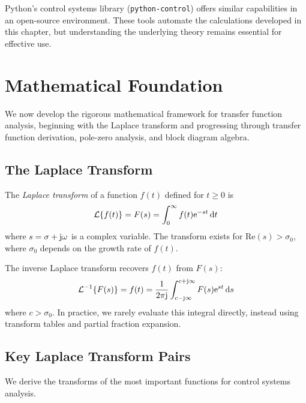 Python's control systems library (\texttt{python-control}) offers similar capabilities in an open-source environment. These tools automate the calculations developed in this chapter, but understanding the underlying theory remains essential for effective use.

\section{Mathematical Foundation}
\label{sec:math_foundation}

We now develop the rigorous mathematical framework for transfer function analysis, beginning with the Laplace transform and progressing through transfer function derivation, pole-zero analysis, and block diagram algebra.

\subsection{The Laplace Transform}
\label{sec:laplace_def}

\begin{definition}
The \textit{Laplace transform} of a function $f(t)$ defined for $t \geq 0$ is
\begin{equation}
\mathcal{L}\{f(t)\} = F(s) = \int_0^{\infty} f(t)\mathrm{e}^{-st}\,\mathrm{d} t
\label{eq:laplace_def}
\end{equation}
where $s = \sigma + \mathrm{j}\omega$ is a complex variable. The transform exists for $\mathrm{Re}(s) > \sigma_0$, where $\sigma_0$ depends on the growth rate of $f(t)$.
\end{definition}

The inverse Laplace transform recovers $f(t)$ from $F(s)$:
\begin{equation}
\mathcal{L}^{-1}\{F(s)\} = f(t) = \frac{1}{2\pi\mathrm{j}}\int_{c-\mathrm{j}\infty}^{c+\mathrm{j}\infty} F(s)\mathrm{e}^{st}\,\mathrm{d} s
\label{eq:inverse_laplace}
\end{equation}
where $c > \sigma_0$. In practice, we rarely evaluate this integral directly, instead using transform tables and partial fraction expansion.

\subsection{Key Laplace Transform Pairs}

We derive the transforms of the most important functions for control systems analysis.

